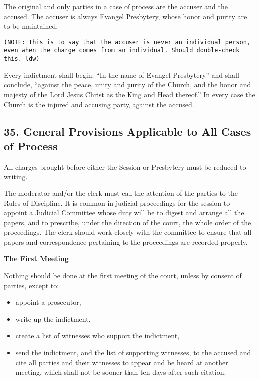 \documentclass[
]{book}
\providecommand{\tightlist}{%
  \setlength{\itemsep}{0pt}\setlength{\parskip}{0pt}}
\begin{document}
The original and only parties in a case of process are the accuser and the accused. The accuser is always Evangel Presbytery, whose honor and purity are to be maintained.

\begin{verbatim}
(NOTE: This is to say that the accuser is never an individual person, even when the charge comes from an individual. Should double-check this. ldw)
\end{verbatim}

Every indictment shall begin: ``In the name of Evangel Presbytery'' and shall conclude, ``against the peace, unity and purity of the Church, and the honor and majesty of the Lord Jesus Christ as the King and Head thereof.'' In every case the Church is the injured and accusing party, against the accused.

\hypertarget{general-provisions-applicable-to-all-cases-of-process}{%
\subsection{35. General Provisions Applicable to All Cases of Process}\label{general-provisions-applicable-to-all-cases-of-process}}

All charges brought before either the Session or Presbytery must be reduced to writing.

The moderator and/or the clerk must call the attention of the parties to the Rules of Discipline. It is common in judicial proceedings for the session to appoint a Judicial Committee whose duty will be to digest and arrange all the papers, and to prescribe, under the direction of the court, the whole order of the proceedings. The clerk should work closely with the committee to ensure that all papers and correspondence pertaining to the proceedings are recorded properly.

\textbf{The First Meeting}

Nothing should be done at the first meeting of the court, unless by consent of parties, except to:

\begin{itemize}
\tightlist
\item
  appoint a prosecutor,
\item
  write up the indictment,
\item
  create a list of witnesses who support the indictment,
\item
  send the indictment, and the list of supporting witnesses, to the accused and cite all parties and their witnesses to appear and be heard at another meeting, which shall not be sooner than ten days after such citation.
\end{itemize}
\end{document}
